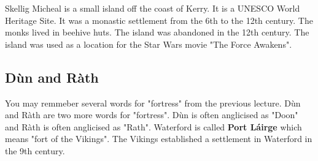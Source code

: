 \documentclass[a4paper]{article}
\begin{document}
Skellig Micheal is a small island off the coast of Kerry. It is a UNESCO World Heritage Site. It was a monastic settlement from the 6th to the 12th century. The monks lived in beehive huts. The island was abandoned in the 12th century. The island was used as a location for the Star Wars movie "The Force Awakens".

\subsection{Dùn and Ràth}

You may remmeber several words for "fortress" from the previous lecture.
Dùn and Ràth are two more words for "fortress". Dùn is often anglicised as "Doon" 
and Ràth is often anglicised as "Rath". Waterford is called \textbf{Port Láirge} which means "fort of the Vikings". The Vikings established a settlement in Waterford in the 9th century.
\end{document}
